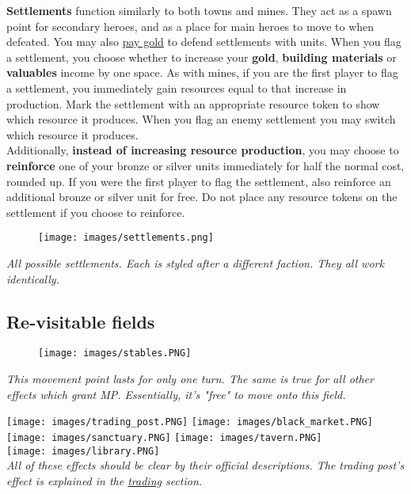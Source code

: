 \documentclass[12pt]{article}
\begin{document}
\clearpage
\textbf{Settlements} function similarly to both towns and mines. They act as a spawn point for secondary heroes, and as a place for main heroes to move to when defeated. You may also \hyperlink{Town}{pay gold} to defend settlements with units. When you flag a settlement, you choose whether to increase your \textbf{gold}, \textbf{building materials} or \textbf{valuables} income by one space. As with mines, if you are the first player to flag a settlement, you immediately gain resources equal to that increase in production. Mark the settlement with an appropriate resource token to show which resource it produces. When you flag an enemy settlement you may switch which resource it produces.\\[6pt]
Additionally, \textbf{instead of increasing resource production}, you may choose to \textbf{reinforce} one of your bronze or silver units immediately for half the normal cost, rounded up. If you were the first player to flag the settlement, also reinforce an additional bronze or silver unit for free. Do not place any resource tokens on the settlement if you choose to reinforce.
\begin{figure}[h]
\centering
\texttt{[image: images/settlements.png]}
\end{figure}
\begin{center}
\textit{All possible settlements. Each is styled after a different faction. They all work identically.}
\end{center}

\subsection*{Re-visitable fields}
\begin{figure}[h]
\centering
\texttt{[image: images/stables.PNG]}
\end{figure}
\begin{center}
\textit{This movement point lasts for only one turn. The same is true for all other effects which grant MP. Essentially, it's "free" to move onto this field.}
\end{center}

\clearpage

\texttt{[image: images/trading\_post.PNG]}
\texttt{[image: images/black\_market.PNG]}\\
\texttt{[image: images/sanctuary.PNG]}
\texttt{[image: images/tavern.PNG]}\\
\texttt{[image: images/library.PNG]}\\[6pt]
\textit{All of these effects should be clear by their official descriptions. The trading post's effect is explained in the \hyperlink{Trading}{trading} section.}
\clearpage
\end{document}
